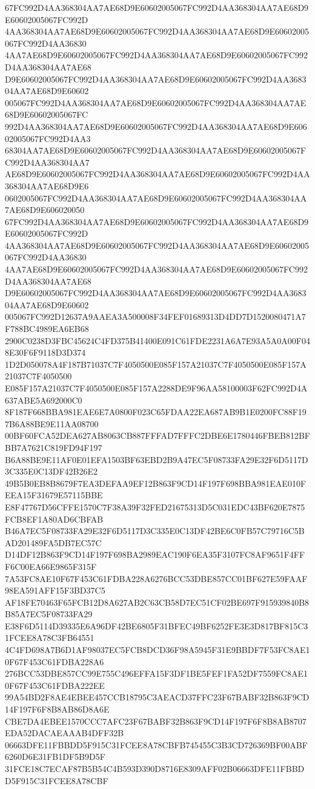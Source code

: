 {{67FC992D4AA368304AA7AE68D9E60602005067FC992D4AA368304AA7AE68D9E60602005067FC992D
4AA368304AA7AE68D9E60602005067FC992D4AA368304AA7AE68D9E60602005067FC992D4AA36830
4AA7AE68D9E60602005067FC992D4AA368304AA7AE68D9E60602005067FC992D4AA368304AA7AE68
D9E60602005067FC992D4AA368304AA7AE68D9E60602005067FC992D4AA368304AA7AE68D9E60602
005067FC992D4AA368304AA7AE68D9E60602005067FC992D4AA368304AA7AE68D9E60602005067FC
992D4AA368304AA7AE68D9E60602005067FC992D4AA368304AA7AE68D9E60602005067FC992D4AA3
68304AA7AE68D9E60602005067FC992D4AA368304AA7AE68D9E60602005067FC992D4AA368304AA7
AE68D9E60602005067FC992D4AA368304AA7AE68D9E60602005067FC992D4AA368304AA7AE68D9E6
0602005067FC992D4AA368304AA7AE68D9E60602005067FC992D4AA368304AA7AE68D9E606020050
67FC992D4AA368304AA7AE68D9E60602005067FC992D4AA368304AA7AE68D9E60602005067FC992D
4AA368304AA7AE68D9E60602005067FC992D4AA368304AA7AE68D9E60602005067FC992D4AA36830
4AA7AE68D9E60602005067FC992D4AA368304AA7AE68D9E60602005067FC992D4AA368304AA7AE68
D9E60602005067FC992D4AA368304AA7AE68D9E60602005067FC992D4AA368304AA7AE68D9E60602
005067FC992D12637A9AAEA3A500008F34FEF01689313D4DD7D1520080471A7F788BC4989EA6EB68
2900C0238D3FBC45624C4FD375B41400E091C61FDE2231A6A7E93A5A0A00F048E30F6F9118D3D374
1D2D050078A4F187B71037C7F4050500E085F157A21037C7F4050500E085F157A21037C7F4050500
E085F157A21037C7F4050500E085F157A2288DE9F96AA58100003F62FC992D4A637ABE5A692000C0
8F187F668BBA981EAE6E7A0800F023C65FDAA22EA687AB9B1E0200FC88F197B6A88BE9E11AA08700
00BF60FCA52DEA627AB8063CB887FFFAD7FFFC2DBE6E1780446FBEB812BFBB7A7621C819FD94F197
B6A88BE9E11AF0E01EFA1503BF63EBD2B9A47EC5F08733FA29E32F6D5117D3C335E0C13DF42B26E2
49B5B0EB8B8679F7EA3DEFAA9EF12B863F9CD14F197F698BBA981EAE010FEEA15F31679E57115BBE
E8F47767D56CFFE1570C7F38A39F32FED21675313D5C031EDC43BF620E7875FCB8EF1A80AD6CBFAB
B46A7EC5F08733FA29E32F6D5117D3C335E0C13DF42BE6C0FB57C79716C5BAD201489FA5DB7EC57C
D14DF12B863F9CD14F197F698BA2989EAC190F6EA35F3107FC8AF9651F4FFF6C00EA66E9865F315F
7A53FC8AE10F67F453C61FDBA228A6276BCC53DBE857CC01BF627E59FAAF98EA591AFF15F3BD37C5
AF18FE70463F65FCB12D8A627AB2C63CB58D7EC51CF02BE697F915939840B8B85A7EC5F08733FA29
E38F6D5114D39335E6A96DF42BE6805F31BFEC49BF6252FE3E3D817BF815C31FCEE8A78C3FB64551
4C4FD698A7B6D1AF98037EC5FCB8DCD36F98A5945F31E9BBDF7F53FC8AE10F67F453C61FDBA228A6
276BCC53DBE857CC99E755C496EFFA15F3DF1BE5FEF1FA52DF7559FC8AE10F67F453C61FDBA222EE
99A54BD2F8AE4EBEE457CCB18795C3AEACD37FFC23F67BABF32B863F9CD14F197F6F8B8AB86D8A6E
CBE7DA4EBEE1570CCC7AFC23F67BABF32B863F9CD14F197F6F8B8AB8707EDA52DACAEAAAB4DFF32B
06663DFE11FBBDD5F915C31FCEE8A78CBFB745455C3B3CD726369BF00ABF6260D6E31FB1DF5B9D5F
31FCE18C7ECAF87B5B54C4B593D390D8716E8309AFF02B06663DFE11FBBDD5F915C31FCEE8A78CBF
}}
